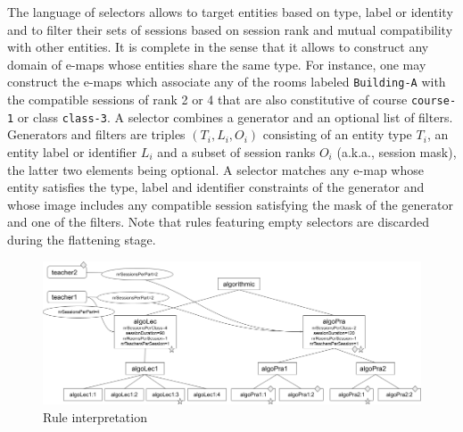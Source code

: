 The language of selectors allows 
to target entities based on type, label or identity
and
to filter their sets of sessions
based on session rank and mutual compatibility with other entities.
It is complete in the sense 
that it allows to construct any domain of e-maps whose entities share the same type.
For instance, one may construct the e-maps which
associate any of the rooms labeled \texttt{Building-A}
with the compatible sessions of rank 2 or 4 
that are also constitutive of course \texttt{course-1} or class \texttt{class-3}.
A selector
combines a generator and an optional list of filters.
Generators and filters are triples 
$
(T_i,L_i,O_i)
$
consisting of
an entity type
$
T_i%
$,
an entity label or identifier
$
L_i%
$
and
a subset of session ranks
$
O_i%
$ (a.k.a., session mask),
the latter two elements being optional.
A selector 
matches any e-map
whose entity satisfies the type, label and identifier constraints of the generator
and whose %
image includes any compatible session
satisfying the mask of the generator
and one of the filters.
Note that rules featuring empty selectors are discarded during the flattening stage. 

\begin{figure}[h]
\centering
\includegraphics[scale=0.5]{img/utp_rule_1.png}
\caption{Rule interpretation}
\label{fig:utp-rule-1}
\end{figure}

